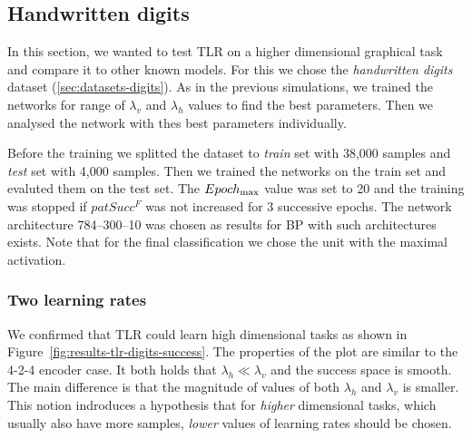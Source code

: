 

\subsection{Handwritten digits} 
\label{sec:results-digits} 

In this section, we wanted to test TLR on a higher dimensional graphical task and compare it to other known models. For this we chose the \emph{handwritten digits} dataset (\ref{sec:datasets-digits}). As in the previous simulations, we trained the networks for range of $\lambda_v$ and $\lambda_h$ values to find the best parameters. Then we analysed the network with thes best parameters individually. 

Before the training we splitted the dataset to \emph{train} set with 38,000 samples and \emph{test} set with 4,000 samples. Then we trained the networks on the train set and evaluted them on the test set. The $Epoch_{\rm max}$ value was set to 20 and the training was stopped if $patSucc^F$ was not increased for 3 successive epochs. The network architecture 784--300--10 was chosen as results for BP with such architectures exists. Note that for the final classification we chose the unit with the maximal activation. 

\subsubsection{Two learning rates} 
\label{sec:tlr-digits} 

We confirmed that TLR could learn high dimensional tasks as shown in Figure~\ref{fig:results-tlr-digits-success}. The properties of the plot are similar to the 4-2-4 encoder case. It both holds that $\lambda_h \ll \lambda_v$ and the success space is smooth. The main difference is that the magnitude of values of both $\lambda_h$ and $\lambda_v$ is smaller. This notion indroduces a hypothesis that for \emph{higher} dimensional tasks, which usually also have more samples, \emph{lower} values of learning rates should be chosen. 

